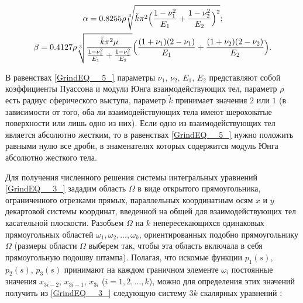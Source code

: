 \begin{equation} 

\label{GrindEQ__5_} 

\begin{array}{c} 

\displaystyle

\alpha =0.8255 \rho  \sqrt[{3}]{\tilde{k}\pi ^{2}  \Bigl(\frac{1-\nu _{1}^{2} }{E_{1} } +\frac{1-\nu _{2}^{2} }{E_{2} } \Bigr)^{2} } ; 

\\[4mm] 

\displaystyle

\beta =0.4127 \rho   \sqrt[{3}]{ \frac{ \tilde{k}\pi ^{2}  \mu }{\frac{1-\nu _{1}^{2} }{E_{1} } +\frac{1-\nu _{2}^{2} }{E_{2} }  } }  

\Bigl(\frac{(1+\nu _{1} ) (2-\nu _{1} )}{E_{1} } +\frac{(1+\nu _{2} ) (2-\nu _{2} )}{E_{2} } \Bigr)

. 

\end{array}

\end{equation}

В равенствах \eqref{GrindEQ__5_} параметры $\nu _{1} $, $\nu _{2} $, $E_{1} $, $E_{2} $ представляют собой коэффициенты Пуассона и модули Юнга взаимодействующих тел, параметр $\rho $ есть радиус сферического выступа, параметр $\tilde{k}$ принимает значения $2$ или $1$ (в зависимости от того, оба ли взаимодействующих тела имеют шероховатые поверхности или лишь одно из них). Если одно из взаимодействующих тел является абсолютно жестким, то в равенствах \eqref{GrindEQ__5_} нужно положить равными нулю все дроби, в знаменателях которых содержится модуль Юнга абсолютно жесткого тела.



\smallskip




Для получения численного решения системы интегральных уравнений \eqref{GrindEQ__3_} зададим область $\Omega $ в виде открытого прямоугольника, ограниченного отрезками прямых, параллельных координатным осям $x$ и $y$ декартовой системы координат, введенной на общей для взаимодействующих тел касательной плоскости. Разобьем $\Omega $ на $k$ непересекающихся одинаковых прямоугольных областей $\omega _{1},\omega _{2},\dots,\omega_{k}$, ориентированных подобно прямоугольнику $\Omega $ (размеры области $\Omega $ выберем так, чтобы эта область включала в себя прямоугольную подошву штампа). Полагая, что искомые функции $p_{1}(s)$, $p_{2}(s)$, $p_{3}(s)$ принимают на каждом граничном элементе $\omega _{i}$ постоянные значения  $x_{3i-2} $, $x_{3i-1} $, $x_{3i} $ ($i= 1, 2, \dots, k$), можно для определения этих значений получить из \eqref{GrindEQ__3_} следующую систему $3k$ скалярных уравнений \cite{al:bib19}:

